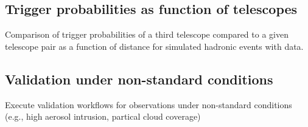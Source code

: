 \subsection{Trigger probabilities as function of telescopes}

Comparison of trigger probabilities of a third telescope compared to a given telescope pair as a function of distance for simulated hadronic events with data.

\subsection{Validation under non-standard conditions}

Execute validation workflows for observations under non-standard conditions (e.g., high aerosol intrusion, partical cloud coverage)